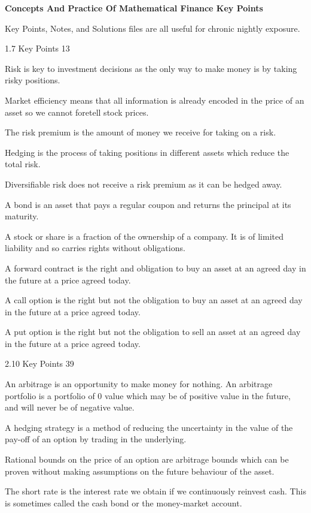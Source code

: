 \Large
\twocolumn

\textbf{Concepts And Practice Of Mathematical Finance Key Points}

Key Points, Notes, and Solutions files are all useful for chronic nightly exposure.

1.7 Key Points 13

Risk is key to investment decisions as the only way to make money is by taking risky positions.

Market efficiency means that all information is already encoded in the price of an asset so we cannot foretell stock prices.

The risk premium is the amount of money we receive for taking on a risk.

Hedging is the process of taking positions in different assets which reduce the total risk.

Diversifiable risk does not receive a risk premium as it can be hedged away.

A bond is an asset that pays a regular coupon and returns the principal at its maturity.

A stock or share is a fraction of the ownership of a company. It is of limited liability and so carries rights without obligations.

A forward contract is the right and obligation to buy an asset at an agreed day in the future at a price agreed today.

A call option is the right but not the obligation to buy an asset at an agreed day in the future at a price agreed today.

A put option is the right but not the obligation to sell an asset at an agreed day in the future at a price agreed today.

2.10 Key Points 39

An arbitrage is an opportunity to make money for nothing. An arbitrage portfolio is a portfolio of $0$ value which may be of positive value in the future, and will never be of negative value.

A hedging strategy is a method of reducing the uncertainty in the value of the pay-off of an option by trading in the underlying.

Rational bounds on the price of an option are arbitrage bounds which can be proven without making assumptions on the future behaviour of the asset.

The short rate is the interest rate we obtain if we continuously reinvest cash. This is sometimes called the cash bond or the money-market account.

